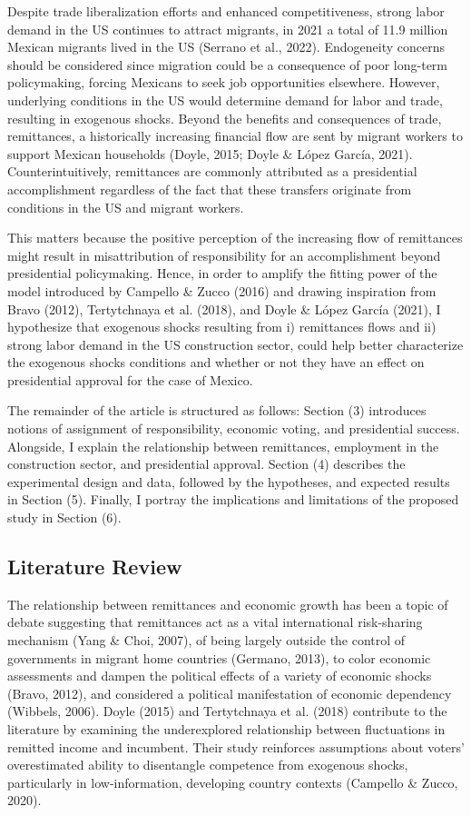 \documentclass[
]{article}
\begin{document}
Despite trade liberalization efforts and enhanced competitiveness,
strong labor demand in the US continues to attract migrants, in 2021 a
total of 11.9 million Mexican migrants lived in the US (Serrano et al.,
2022). Endogeneity concerns should be considered since migration could
be a consequence of poor long-term policymaking, forcing Mexicans to
seek job opportunities elsewhere. However, underlying conditions in the
US would determine demand for labor and trade, resulting in exogenous
shocks. Beyond the benefits and consequences of trade, remittances, a
historically increasing financial flow are sent by migrant workers to
support Mexican households (Doyle, 2015; Doyle \& López García, 2021).
Counterintuitively, remittances are commonly attributed as a
presidential accomplishment regardless of the fact that these transfers
originate from conditions in the US and migrant workers.

This matters because the positive perception of the increasing flow of
remittances might result in misattribution of responsibility for an
accomplishment beyond presidential policymaking. Hence, in order to
amplify the fitting power of the model introduced by Campello \& Zucco
(2016) and drawing inspiration from Bravo (2012), Tertytchnaya et al.
(2018), and Doyle \& López García (2021), I hypothesize that exogenous
shocks resulting from i) remittances flows and ii) strong labor demand
in the US construction sector, could help better characterize the
exogenous shocks conditions and whether or not they have an effect on
presidential approval for the case of Mexico.

The remainder of the article is structured as follows: Section (3)
introduces notions of assignment of responsibility, economic voting, and
presidential success. Alongside, I explain the relationship between
remittances, employment in the construction sector, and presidential
approval. Section (4) describes the experimental design and data,
followed by the hypotheses, and expected results in Section (5).
Finally, I portray the implications and limitations of the proposed
study in Section (6).

\hypertarget{literature-review}{%
\subsection{Literature Review}\label{literature-review}}

The relationship between remittances and economic growth has been a
topic of debate suggesting that remittances act as a vital international
risk-sharing mechanism (Yang \& Choi, 2007), of being largely outside
the control of governments in migrant home countries (Germano, 2013), to
color economic assessments and dampen the political effects of a variety
of economic shocks (Bravo, 2012), and considered a political
manifestation of economic dependency (Wibbels, 2006). Doyle (2015) and
Tertytchnaya et al. (2018) contribute to the literature by examining the
underexplored relationship between fluctuations in remitted income and
incumbent. Their study reinforces assumptions about voters'
overestimated ability to disentangle competence from exogenous shocks,
particularly in low-information, developing country contexts (Campello
\& Zucco, 2020).
\end{document}
